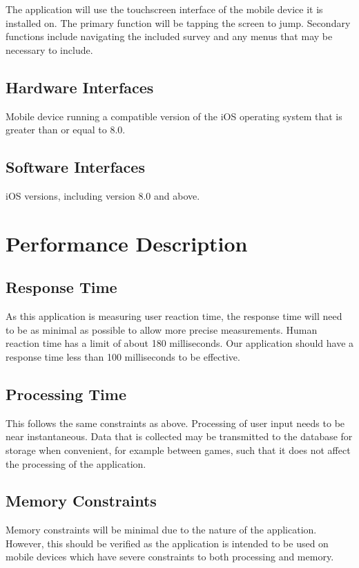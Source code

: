 \documentclass[a4wide]{article}
\begin{document}
The application will use the touchscreen interface of the mobile device it is
installed on.  The primary function will be tapping the screen to jump.
Secondary functions include navigating the included survey and any menus that may
be necessary to include.

\subsection{Hardware Interfaces}

Mobile device running a compatible version of the iOS operating system that is greater than or equal to 8.0.


\subsection{Software Interfaces}

iOS versions, including version 8.0 and above.



\section{Performance Description}

\subsection{Response Time}
As this application is measuring user reaction time, the response time will need
to be as minimal as possible to allow more precise measurements.  Human reaction
time has a limit of about 180 milliseconds.  Our application should have a
response time less than 100 milliseconds to be effective.

\subsection{Processing Time}
This follows the same constraints as above.  Processing of user input needs to
be near instantaneous.  Data that is collected may be transmitted to the
database for storage when convenient, for example between games, such that it
does not affect the processing of the application.

\subsection{Memory Constraints}
Memory constraints will be minimal due to the nature of the application.
However, this should be verified as the application is intended to be used on
mobile devices which have severe constraints to both processing and memory.
\end{document}
